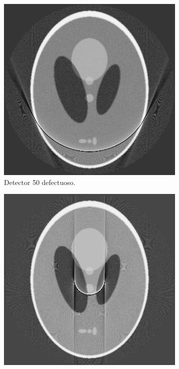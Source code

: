 \documentclass[letterpaper,12pt]{article}
\theoremstyle{plain}
\begin{document}
\begin{figure}[H]
\begin{subfigure}[h]{0.24\textwidth}
       \end{subfigure}
        \begin{subfigure}[h]{0.24\textwidth}
           \centering
           \includegraphics[width=\textwidth]{Figuras/reconstruction_50_EQ.png}
           \caption{Detector 50 defectuoso.} 
           \label{fig:sinograma_50}
        \end{subfigure}
        \begin{subfigure}[h]{0.24\textwidth}
           \centering
           \includegraphics[width=\textwidth]{Figuras/reconstruction_150_EQ.png}

\end{subfigure}
\end{figure}
\end{document}
